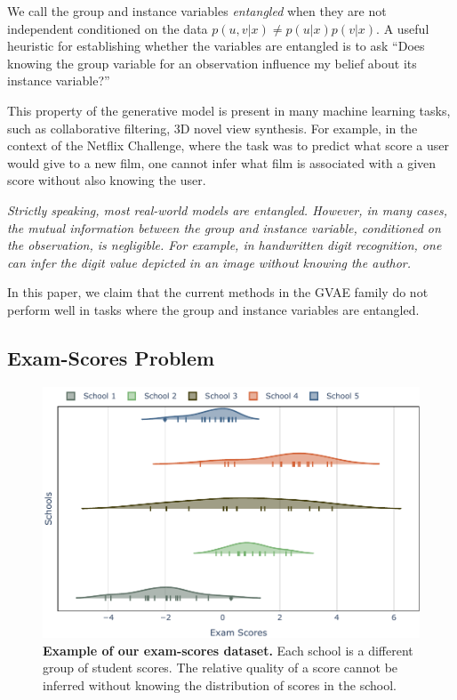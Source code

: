 \documentclass[nohyperref]{article}
\theoremstyle{plain}
\theoremstyle{definition}
\theoremstyle{remark}
\begin{document}
We call the group and instance variables \textit{entangled} when they are not independent conditioned on the data $p(u, v | x) \neq p(u | x) p(v | x)$. A useful heuristic for establishing whether the variables are entangled is to ask ``Does knowing the group variable for an observation influence my belief about its instance variable?''

This property of the generative model is present in many machine learning tasks, such as collaborative filtering, 3D novel view synthesis. For example, in the context of the Netflix Challenge, where the task was to predict what score a user would give to a new film, one cannot infer what film is associated with a given score without also knowing the user.

\textit{Strictly speaking, most real-world models are entangled. However, in many cases, the mutual information between the group and instance variable, conditioned on the observation, is negligible. For example, in handwritten digit recognition, one can infer the digit value depicted in an image without knowing the author.}

In this paper, we claim that the current methods in the GVAE family do not perform well in tasks where the group and instance variables are entangled.

\subsection{Exam-Scores Problem}

\begin{figure}[t]
    \vskip 0.2in
    \begin{center}
    \centerline{\includegraphics[width=\columnwidth]{files/data.pdf}}
    \caption{\textbf{Example of our exam-scores dataset.} Each school is a different group of student scores. The relative quality of a score cannot be inferred without knowing the distribution of scores in the school.}
    \label{exam-score}
    \end{center}
    \vskip -0.2in
\end{figure}
\end{document}
